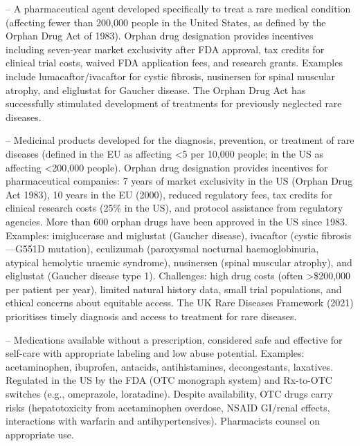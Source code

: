 -- A pharmaceutical agent developed specifically to treat a rare medical condition (affecting fewer than 200,000 people in the United States, as defined by the Orphan Drug Act of 1983). Orphan drug designation provides incentives including seven-year market exclusivity after FDA approval, tax credits for clinical trial costs, waived FDA application fees, and research grants. Examples include lumacaftor/ivacaftor for cystic fibrosis, nusinersen for spinal muscular atrophy, and eliglustat for Gaucher disease. The Orphan Drug Act has successfully stimulated development of treatments for previously neglected rare diseases.

-- Medicinal products developed for the diagnosis, prevention, or treatment of rare diseases (defined in the EU as affecting <5 per 10,000 people; in the US as affecting <200,000 people). Orphan drug designation provides incentives for pharmaceutical companies: 7 years of market exclusivity in the US (Orphan Drug Act 1983), 10 years in the EU (2000), reduced regulatory fees, tax credits for clinical research costs (25\% in the US), and protocol assistance from regulatory agencies. More than 600 orphan drugs have been approved in the US since 1983. Examples: imiglucerase and miglustat (Gaucher disease), ivacaftor (cystic fibrosis—G551D mutation), eculizumab (paroxysmal nocturnal haemoglobinuria, atypical hemolytic uraemic syndrome), nusinersen (spinal muscular atrophy), and eliglustat (Gaucher disease type 1). Challenges: high drug costs (often >\$200,000 per patient per year), limited natural history data, small trial populations, and ethical concerns about equitable access. The UK Rare Diseases Framework (2021) prioritises timely diagnosis and access to treatment for rare diseases.

-- Medications available without a prescription, considered safe and effective for self-care with appropriate labeling and low abuse potential. Examples: acetaminophen, ibuprofen, antacids, antihistamines, decongestants, laxatives. Regulated in the US by the FDA (OTC monograph system) and Rx-to-OTC switches (e.g., omeprazole, loratadine). Despite availability, OTC drugs carry risks (hepatotoxicity from acetaminophen overdose, NSAID GI/renal effects, interactions with warfarin and antihypertensives). Pharmacists counsel on appropriate use.

